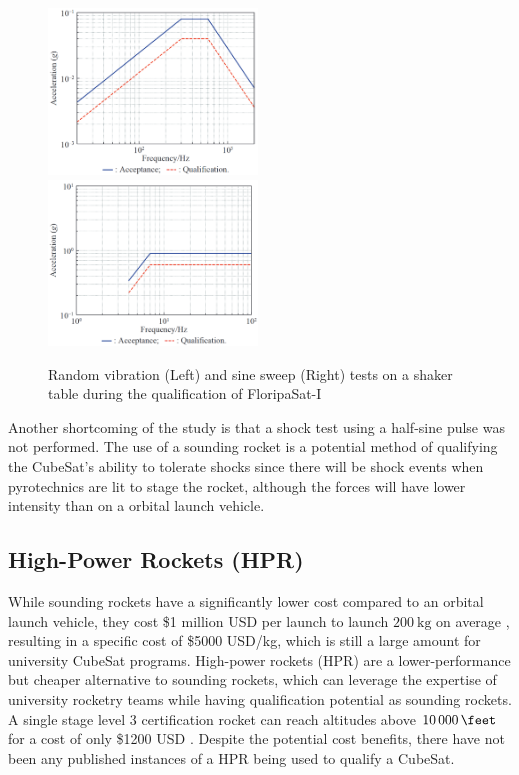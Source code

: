 \documentclass{report}
\begin{document}
\begin{figure}[H]
  \includegraphics[width=0.495\textwidth]{images/floripa-random-spectrum.png}
  \includegraphics[width=0.495\textwidth]{images/floripa-sinusoid.png}
  \caption{Random vibration (Left) and sine sweep (Right) tests on a shaker table during the qualification of FloripaSat-I \cite{9316404}}
  \label{fig:shaker}
\end{figure}

Another shortcoming of the study is that a shock test using a half-sine pulse was not performed. The use of a sounding rocket is a potential method of qualifying the CubeSat's ability to tolerate shocks since there will be shock events when pyrotechnics are lit to stage the rocket, although the forces will have lower intensity than on a orbital launch vehicle.

\subsection{High-Power Rockets (HPR)}
While sounding rockets have a significantly lower cost compared to an orbital launch vehicle, they cost \$1 million USD per launch to launch $\SI{200}{\kilo\gram}$ on average \cite{jurist2009commercial}, resulting in a specific cost of \$5000 USD/kg, which is still a large amount for university CubeSat programs. High-power rockets (HPR) are a lower-performance but cheaper alternative to sounding rockets, which can leverage the expertise of university rocketry teams while having qualification potential as sounding rockets. A single stage level 3 certification rocket can reach altitudes above $\SI{10000}{\feet}$ \cite{canepa2005modern} for a cost of only \$1200 USD \cite{canepa2005modern}. Despite the potential cost benefits, there have not been any published instances of a HPR being used to qualify a CubeSat.
\end{document}
